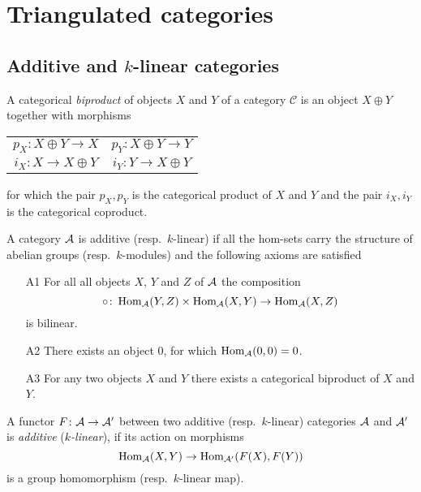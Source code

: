\section{Triangulated categories}

\subsection{Additive and $k$-linear categories}

A categorical \emph{biproduct} of objects $X$ and $Y$ of a category $\mathcal C$ is an object $X \oplus Y$ together with morphisms
\begin{center}
    \begin{tabular}{c c}
        $p_X\colon X \oplus Y \to X$ & $p_Y\colon X \oplus Y \to Y$ \\
        $i_X\colon X \to X \oplus Y$ & $i_Y\colon Y \to X \oplus Y$ \\
    \end{tabular}
\end{center}
for which the pair $p_X, p_Y$ is the categorical product of $X$ and $Y$ and the pair $i_X, i_Y$ is the categorical coproduct.


\begin{definition}
    A category $\mathcal A$ is additive (resp.\ $k$-linear) if all the hom-sets carry the structure of abelian groups (resp.\ $k$-modules) and the following axioms are satisfied
    \begin{enumerate}
        \item[A1] For all all objects $X$, $Y$ and $Z$ of $\mathcal A$ the composition
        \[
            \circ \colon \operatorname{Hom}_{\mathcal A}(Y, Z) \times \operatorname{Hom}_{\mathcal A}(X, Y) \to \operatorname{Hom}_{\mathcal A}(X, Z)
        \] 
        is bilinear.
        \item[A2] There exists an object $0$, for which $\operatorname{Hom}_\mathcal A(0,0) = 0$.
        \item[A3] For any two objects $X$ and $Y$ there exists a categorical biproduct of $X$ and $Y$. 
    \end{enumerate} 
\end{definition}

\begin{definition}
    A functor $F \colon \mathcal A \to \mathcal A'$ between two additive (resp.\ $k$-linear) categories $\mathcal A$ and $\mathcal A'$ is \emph{additive} (\resp \emph{$k$-linear}), if its action on morphisms
    \[
        \operatorname{Hom}_\mathcal A(X, Y) \to \operatorname{Hom}_{\mathcal A'}(F(X), F(Y))
    \] 
    is a group homomorphism (resp.\ $k$-linear map).
\end{definition}

